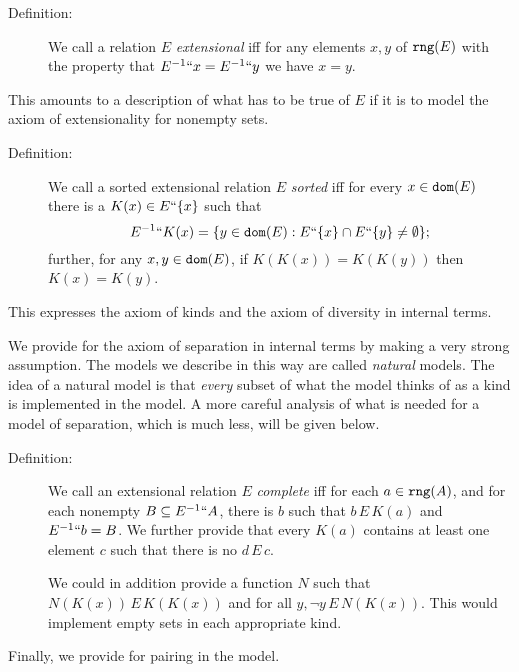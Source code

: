 \documentclass[12pt]{article}
\begin{document}
\begin{description}

\item[Definition:]  We call a relation $E$ {\em extensional\/} iff for any elements $x,y$ of ${\tt rng}(E)$ with the property that $E^{-1}``x = E^{-1}``y$ we have $x=y$.

\end{description}

This amounts to a description of what has to be true of $E$ if it is to model the axiom of extensionality for nonempty sets.

\begin{description}

\item[Definition:]  We call a sorted extensional relation $E$ {\em sorted\/} iff for every $x \in {\tt dom}(E)$ there is a $K(x) \in E``\{x\}$ such that $$E^{-1}``K(x) = \{y \in {\tt dom}(E): E``\{x\} \cap E``\{y\} \neq \emptyset\};$$ further, for any $x,y \in {\tt dom}(E)$, if $K(K(x)) = K(K(y))$ then $K(x)=K(y)$.

\end{description}

This expresses the axiom of kinds and the axiom of diversity in internal terms.

We provide for the axiom of separation in internal terms by making a very strong assumption.  The models we describe in this way are called {\em natural\/} models.  The idea of a natural model is that {\em every\/} subset of what the model thinks of as a kind
is implemented in the model.  A more careful analysis of what is needed for a model of separation, which is much less, will be given below.
\begin{description}
\item[Definition:]  We call an extensional relation $E$ {\em complete\/} iff for each $a \in {\tt rng}(A)$, and for each nonempty $B \subseteq E^{-1}``A$, there is $b$ such that $b \,E\, K(a)$ and $E^{-1}``b = B$.  We further provide that every
$K(a)$ contains at least one element $c$ such that there is no $d \, E \, c$.

We could in addition provide a function $N$ such that $N(K(x)) \,E\,K(K(x))$ and for all $y, \neg y\,E\,N(K(x))$.  This would implement empty sets in each appropriate kind.

\end{description}

Finally, we provide for pairing in the model.
\end{document}
